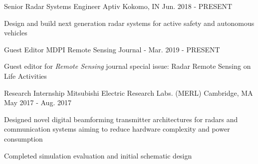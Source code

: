 
\begin{cventries}

    \cventry
        {Senior Radar Systems Engineer}
        {Aptiv}
        {Kokomo, IN}
        {Jun. 2018 - PRESENT}
        {
            \begin{cvitems}
                \item {Design and build next generation radar systems for active safety and autonomous vehicles}
            \end{cvitems}
        }
        
    \cventry
        {Guest Editor}
        {MDPI Remote Sensing Journal}
        {-}
        {Mar. 2019 - PRESENT}
        {
            \begin{cvitems}
                \item {Guest editor for {\em{Remote Sensing}} journal special issue: Radar Remote Sensing on Life Activities}
            \end{cvitems}
        }

    \cventry
        {Research Internship}
        {Mitsubishi Electric Research Labs. (MERL)}
        {Cambridge, MA}
        {May 2017 - Aug. 2017}
        {
            \begin{cvitems}
                \item {Designed novel digital beamforming transmitter architectures for radars and communication systems aiming to reduce hardware complexity and power consumption}
                \item {Completed simulation evaluation and initial schematic design}
            \end{cvitems}
        }

\end{cventries}
